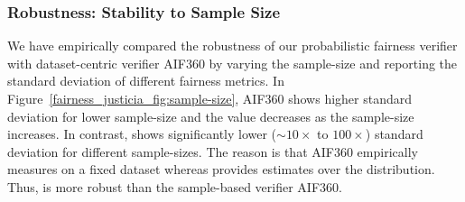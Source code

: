 \subsubsection{Robustness: Stability to Sample Size} 
We have empirically compared the robustness of our probabilistic fairness verifier {\justicia} with dataset-centric verifier AIF360 by varying the sample-size and reporting the standard deviation of different fairness metrics. 
In Figure~\ref{fairness_justicia_fig:sample-size}, AIF360 shows higher standard deviation for lower sample-size and the value decreases as  the sample-size increases. 
In contrast, {\justicia} shows significantly lower ($\sim10\times$ to $100\times$) standard deviation for different sample-sizes. 
The reason is that AIF360 empirically measures on a fixed dataset whereas {\justicia} provides estimates over the distribution.
Thus, {\justicia} is more robust than the sample-based verifier AIF360.

